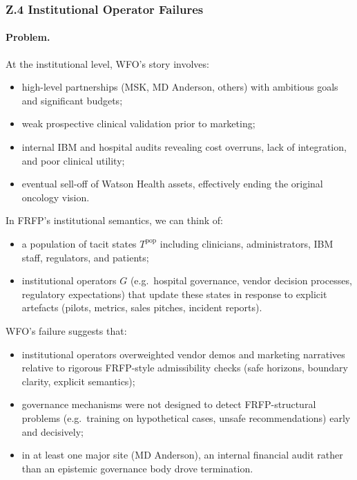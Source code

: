 \subsubsection*{Z.4 Institutional Operator Failures}

\paragraph{Problem.}
At the institutional level, WFO’s story involves:

\begin{itemize}
  \item high-level partnerships (MSK, MD Anderson, others) with ambitious
        goals and significant budgets;
  \item weak prospective clinical validation prior to marketing;
  \item internal IBM and hospital audits revealing cost overruns, lack of
        integration, and poor clinical utility;
  \item eventual sell-off of Watson Health assets, effectively ending the
        original oncology vision.
\end{itemize}

In FRFP’s institutional semantics, we can think of:

\begin{itemize}
  \item a population of tacit states \(T^{\mathrm{pop}}\) including clinicians,
        administrators, IBM staff, regulators, and patients;
  \item institutional operators \(G\) (e.g.\ hospital governance, vendor
        decision processes, regulatory expectations) that update these states
        in response to explicit artefacts (pilots, metrics, sales pitches,
        incident reports).
\end{itemize}

WFO’s failure suggests that:

\begin{itemize}
  \item institutional operators overweighted vendor demos and marketing
        narratives relative to rigorous FRFP-style admissibility checks
        (safe horizons, boundary clarity, explicit semantics);
  \item governance mechanisms were not designed to detect FRFP-structural
        problems (e.g.\ training on hypothetical cases, unsafe recommendations)
        early and decisively;
  \item in at least one major site (MD Anderson), an internal financial audit
        rather than an epistemic governance body drove termination.
\end{itemize}

